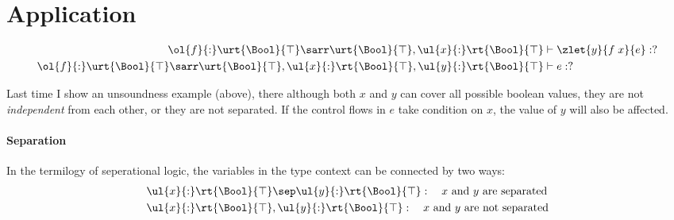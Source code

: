 \section{Application}

\begin{align*}
    \ol{f}{:}\urt{\Bool}{\top}\sarr\urt{\Bool}{\top}, \ul{x}{:}\rt{\Bool}{\top} &\vdash \zlet{y}{f\;x}{e} : ?
    \\ \ol{f}{:}\urt{\Bool}{\top}\sarr\urt{\Bool}{\top}, \ul{x}{:}\rt{\Bool}{\top}, \ul{y}{:}\rt{\Bool}{\top} &\vdash e : ?
\end{align*}\noindent

Last time I show an unsoundness example (above), there although both $x$ and $y$ can cover all possible boolean values, they are not \emph{independent} from each other, or they are not separated. If the control flows in $e$ take condition on $x$, the value of $y$ will also be affected.

\paragraph{Separation} In the termilogy of seperational logic, the variables in the type context can be connected by two ways:
\begin{align*}
    &\ul{x}{:}\rt{\Bool}{\top} \sep \ul{y}{:}\rt{\Bool}{\top} : \quad \text{$x$ and $y$ are separated}
    \\ &\ul{x}{:}\rt{\Bool}{\top} , \ul{y}{:}\rt{\Bool}{\top} : \quad \text{$x$ and $y$ are not separated}
\end{align*}\noindent

